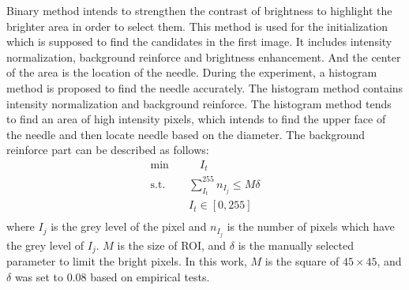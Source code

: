 \documentclass[journal,article,submit,moreauthors,pdftex]{Definitions/mdpi}
\begin{document}
Binary method intends to strengthen the contrast of brightness to highlight the brighter area in order to select them.
This method is used for the initialization which is supposed to find the candidates in the first image.
It includes intensity normalization, background reinforce and brightness enhancement.
And the center of the area is the location of the needle.
During the experiment, a histogram method is proposed to find the needle accurately.
The histogram method contains intensity normalization and background reinforce.
The histogram method tends to find an area of high intensity pixels, which intends to find the upper face of the needle and then locate needle based on the diameter.
The background reinforce part can be described as follows:
\begin{equation}
\begin{aligned}
\textrm{min} \quad & \quad I_t \\
\textrm{s.t.} \quad & \sum_{I_t}^{255} n_{I_j} \leq M\delta \\
 &I_t\in[0,255] \\
\end{aligned}
\end{equation}
where ${I_j}$ is the grey level of the pixel and ${n_{I_j}}$ is the number of pixels which have the grey level of ${I_j}$.
${M}$ is the size of ROI, and ${\delta}$ is the manually selected parameter to limit the bright pixels.
In this work, ${M}$ is the square of ${45\times45}$, and ${\delta}$ was set to 0.08 based on empirical tests.
\end{document}
